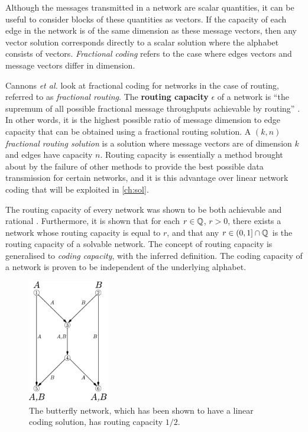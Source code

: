 Although the messages transmitted in a network are scalar quantities, it can be useful to consider blocks of these quantities as vectors. If the capacity of each edge in the network is of the same dimension as these message vectors, then any vector solution corresponds directly to a scalar solution where the alphabet consists of vectors. \emph{Fractional coding} refers to the case where edges vectors and message vectors differ in dimension.

Cannons \textit{et al.} \cite{cann2006} look at fractional coding for networks in the case of routing, referred to as \emph{fractional routing}. The \textbf{routing capacity} $\epsilon$ of a network is ``the supremum of all possible fractional message throughputs achievable by routing'' \cite{cann2006}. In other words, it is the highest possible ratio of message dimension to edge capacity that can be obtained using a fractional routing solution. A \emph{$(k, n)$ fractional routing solution} is a solution where message vectors are of dimension $k$ and edges have capacity $n$. Routing capacity is essentially a method brought about by the failure of other methods to provide the best possible data transmission for certain networks, and it is this advantage over linear network coding that will be exploited in \autoref{ch:sol}.

The routing capacity of every network was shown to be both achievable and rational \cite{cann2006}. Furthermore, it is shown that for each $r \in \mathbb{Q}$, $r > 0$, there exists a network whose routing capacity is equal to $r$, and that any $r \in (0, 1] \cap \mathbb{Q}$ is the routing capacity of a solvable network. The concept of routing capacity is generalised to \emph{coding capacity}, with the inferred definition. The coding capacity of a network is proven to be independent of the underlying alphabet.

\begin{figure}[ht]
	\centering
	\includegraphics[width=100pt]{figures/butterfly-routing.pdf}
	\caption[Routing capacity of the butterfly network]{The butterfly network, which has been shown to have a linear coding solution, has routing capacity $1/2$.}
	\label{butterfly-routing}
\end{figure}

